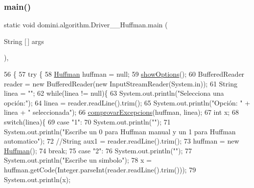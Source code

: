 \subsubsection{\texorpdfstring{main()}{main()}}
{\footnotesize\ttfamily static void domini.\+algorithm.\+Driver\+\_\+\+\_\+\+Huffman.\+main (\begin{DoxyParamCaption}\item[{String \mbox{[}$\,$\mbox{]}}]{args }\end{DoxyParamCaption})\hspace{0.3cm}{\ttfamily [inline]}, {\ttfamily [static]}}


\begin{DoxyCode}
56                                            \{
57     \textcolor{keywordflow}{try} \{
58         \hyperlink{classHuffman}{Huffman} huffman = null;
59         \hyperlink{classdomini_1_1algorithm_1_1Driver____Huffman_a0504e4a97aa7c7a0ad7c1a75187adb10}{showOptions}();
60         BufferedReader reader = \textcolor{keyword}{new} BufferedReader(\textcolor{keyword}{new} InputStreamReader(System.in));
61         String linea = \textcolor{stringliteral}{""};
62         \textcolor{keywordflow}{while}(linea != null)\{
63             System.out.println(\textcolor{stringliteral}{"Selecciona una opción:"});
64             linea = reader.readLine().trim();
65             System.out.println(\textcolor{stringliteral}{"Opción: "} + linea + \textcolor{stringliteral}{" seleccionada"});
66             \hyperlink{classdomini_1_1algorithm_1_1Driver____Huffman_a5d56f18f1d8f96dfc735b9a127094319}{comprovarExcepcions}(huffman, linea);
67             \textcolor{keywordtype}{int} x;
68             \textcolor{keywordflow}{switch}(linea)\{
69                 \textcolor{keywordflow}{case} \textcolor{stringliteral}{"1"}:
70                     System.out.println(\textcolor{stringliteral}{""});
71                     System.out.println(\textcolor{stringliteral}{"Escribe un 0 para Huffman manual y un 1 para Huffman automatico"});
72                     \textcolor{comment}{//String aux1 = reader.readLine().trim();}
73                     huffman = \textcolor{keyword}{new} \hyperlink{classHuffman}{Huffman}();
74                 \textcolor{keywordflow}{break};
75                 \textcolor{keywordflow}{case} \textcolor{stringliteral}{"2"}:
76                     System.out.println(\textcolor{stringliteral}{""});
77                     System.out.println(\textcolor{stringliteral}{"Escribe un simbolo"});
78                     x = huffman.getCode(Integer.parseInt(reader.readLine().trim()));
79                     System.out.println(x);

\end{DoxyCode}
